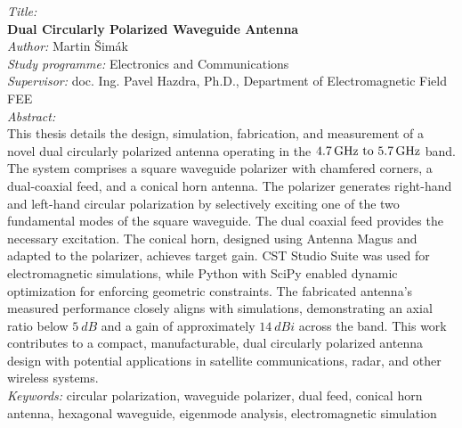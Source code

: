 \clearpage
\noindent\textit{Title:}\\
\textbf{Dual Circularly Polarized Waveguide Antenna}\\[0.25cm]
\textit{Author:} Martin Šimák\\[0.25cm]
\textit{Study programme:} Electronics and Communications\\[0.25cm]
\textit{Supervisor:} doc. Ing. Pavel Hazdra, Ph.D., Department of Electromagnetic Field FEE\\[0.25cm]
\textit{Abstract:}\\
This thesis details the design, simulation, fabrication, and measurement of a novel dual circularly polarized antenna operating in the $\frequencyrange$ band. The system comprises a square waveguide polarizer with chamfered corners, a dual-coaxial feed, and a conical horn antenna. The polarizer generates right-hand and left-hand circular polarization by selectively exciting one of the two fundamental modes of the square waveguide. The dual coaxial feed provides the necessary excitation. The conical horn, designed using Antenna Magus and adapted to the polarizer, achieves target gain. CST Studio Suite was used for electromagnetic simulations, while Python with SciPy enabled dynamic optimization for enforcing geometric constraints. The fabricated antenna's measured performance closely aligns with simulations, demonstrating an axial ratio below $\qty{5}{dB}$ and a gain of approximately $\qty{14}{dBi}$ across the band. This work contributes to a compact, manufacturable, dual circularly polarized antenna design with potential applications in satellite communications, radar, and other wireless systems.\\[0.25cm]
\textit{Keywords:} circular polarization, waveguide polarizer, dual feed, conical horn antenna, hexagonal waveguide, eigenmode analysis, electromagnetic simulation\\[0.5cm]
